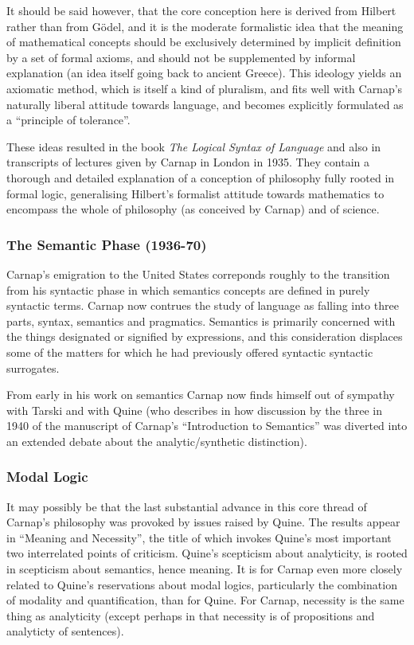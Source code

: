 \documentclass[10pt,titlepage]{book}
\def\ouml{\"o}
\begin{document}
It should be said however, that the core conception here is derived from Hilbert rather than from G{\ouml}del, and it is the moderate formalistic idea that the meaning of mathematical concepts should be exclusively determined by implicit definition by a set of formal axioms, and should not be supplemented by informal explanation (an idea itself going back to ancient Greece).
This ideology yields an axiomatic method, which is itself a kind of pluralism, and fits well with Carnap's naturally liberal attitude towards language, and becomes explicitly formulated as a ``principle of tolerance''.

These ideas resulted in the book \emph{The Logical Syntax of Language} \cite{carnap34,carnap37} and also in transcripts \cite{carnap35} of lectures given by Carnap in London in 1935.
They contain a thorough and detailed explanation of a conception of philosophy fully rooted in formal logic, generalising Hilbert's formalist attitude towards mathematics to encompass the whole of philosophy (as conceived by Carnap) and of science.

\subsubsection{The Semantic Phase (1936-70)}

Carnap's emigration to the United States correponds roughly to the transition from his syntactic phase in which semantics concepts are defined in purely syntactic terms.
Carnap now contrues the study of language as falling into three parts, syntax, semantics and pragmatics.
Semantics is primarily concerned with the things designated or signified by expressions, and this consideration displaces some of the matters for which he had previously offered syntactic syntactic surrogates.

From early in his work on semantics Carnap now finds himself out of sympathy with Tarski and with Quine (who describes in \cite{quineAB}\cite{quine86} how discussion by the three in 1940 of the manuscript of Carnap's ``Introduction to Semantics'' was diverted into an extended debate about the analytic/synthetic distinction).

\subsubsection{Modal Logic}

It may possibly be that the last substantial advance in this core thread of Carnap's philosophy was provoked by issues raised by Quine.
The results appear in ``Meaning and Necessity'', the title of which invokes Quine's most important two interrelated points of criticism.
Quine's scepticism about analyticity, is rooted in scepticism about semantics, hence meaning.
It is for Carnap even more closely related to Quine's reservations about modal logics, particularly the combination of modality and quantification, than for Quine.
For Carnap, necessity is the same thing as analyticity (except perhaps in that necessity is of propositions and analyticty of sentences).
\end{document}
